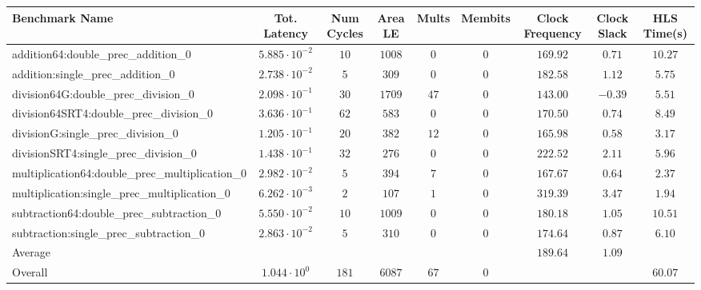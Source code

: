 \begin{tabular}{|l|c|c|c|c|c|c|c|c|}
\hline
Benchmark Name                                   & Tot. Latency            & Num Cycles & Area LE  & Mults  & Membits & Clock Frequency & Clock Slack & HLS Time(s) \\
\hline
addition64:double\_prec\_addition\_0             & $ 5.885 \cdot 10^{-2} $ & $ 10     $ & $ 1008 $ & $ 0  $ & $ 0   $ & $ 169.92      $ & $ 0.71    $ & $ 10.27   $ \\
addition:single\_prec\_addition\_0               & $ 2.738 \cdot 10^{-2} $ & $ 5      $ & $ 309  $ & $ 0  $ & $ 0   $ & $ 182.58      $ & $ 1.12    $ & $ 5.75    $ \\
division64G:double\_prec\_division\_0            & $ 2.098 \cdot 10^{-1} $ & $ 30     $ & $ 1709 $ & $ 47 $ & $ 0   $ & $ 143.00      $ & $ -0.39   $ & $ 5.51    $ \\
division64SRT4:double\_prec\_division\_0         & $ 3.636 \cdot 10^{-1} $ & $ 62     $ & $ 583  $ & $ 0  $ & $ 0   $ & $ 170.50      $ & $ 0.74    $ & $ 8.49    $ \\
divisionG:single\_prec\_division\_0              & $ 1.205 \cdot 10^{-1} $ & $ 20     $ & $ 382  $ & $ 12 $ & $ 0   $ & $ 165.98      $ & $ 0.58    $ & $ 3.17    $ \\
divisionSRT4:single\_prec\_division\_0           & $ 1.438 \cdot 10^{-1} $ & $ 32     $ & $ 276  $ & $ 0  $ & $ 0   $ & $ 222.52      $ & $ 2.11    $ & $ 5.96    $ \\
multiplication64:double\_prec\_multiplication\_0 & $ 2.982 \cdot 10^{-2} $ & $ 5      $ & $ 394  $ & $ 7  $ & $ 0   $ & $ 167.67      $ & $ 0.64    $ & $ 2.37    $ \\
multiplication:single\_prec\_multiplication\_0   & $ 6.262 \cdot 10^{-3} $ & $ 2      $ & $ 107  $ & $ 1  $ & $ 0   $ & $ 319.39      $ & $ 3.47    $ & $ 1.94    $ \\
subtraction64:double\_prec\_subtraction\_0       & $ 5.550 \cdot 10^{-2} $ & $ 10     $ & $ 1009 $ & $ 0  $ & $ 0   $ & $ 180.18      $ & $ 1.05    $ & $ 10.51   $ \\
subtraction:single\_prec\_subtraction\_0         & $ 2.863 \cdot 10^{-2} $ & $ 5      $ & $ 310  $ & $ 0  $ & $ 0   $ & $ 174.64      $ & $ 0.87    $ & $ 6.10    $ \\
\hline
Average                                          & $                     $ & $        $ & $      $ & $    $ & $     $ & $ 189.64      $ & $ 1.09    $ & $         $ \\
\hline
Overall                                          & $ 1.044 \cdot 10^{0}  $ & $ 181    $ & $ 6087 $ & $ 67 $ & $ 0   $ & $             $ & $         $ & $ 60.07   $ \\
\hline
\end{tabular}
